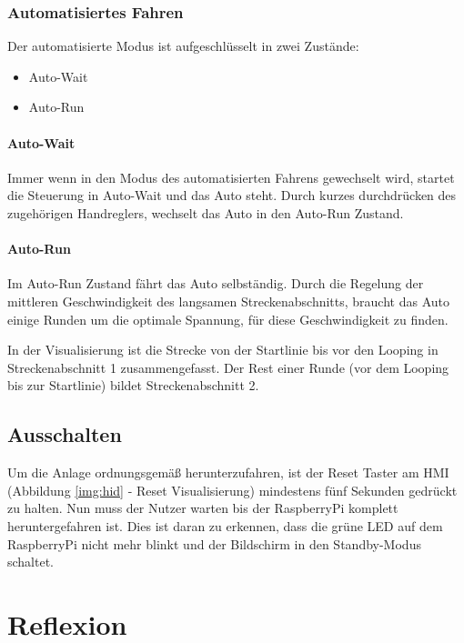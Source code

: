 \documentclass[a4paper, 11pt]{report}
\begin{document}
	\subsection{Automatisiertes Fahren}\label{subsec:bedAuto}
		Der automatisierte Modus ist aufgeschlüsselt in zwei Zustände:
		\begin{itemize}
			\item Auto-Wait
			\item Auto-Run
		\end{itemize}
		\subsubsection{Auto-Wait}
		Immer wenn in den Modus des automatisierten Fahrens gewechselt wird, startet die Steuerung in
		Auto-Wait und das Auto steht.
		Durch kurzes durchdrücken des zugehörigen Handreglers, wechselt das Auto in den Auto-Run Zustand.
		\subsubsection{Auto-Run}
			Im Auto-Run Zustand fährt das Auto selbständig. Durch die Regelung der mittleren Geschwindigkeit des langsamen Streckenabschnitts, braucht das Auto einige Runden um die optimale Spannung, für diese Geschwindigkeit zu finden.

			In der Visualisierung ist die Strecke von der Startlinie bis vor den Looping in Streckenabschnitt 1 zusammengefasst.
			Der Rest einer Runde (vor dem Looping bis zur Startlinie) bildet Streckenabschnitt 2.
\section{Ausschalten}
Um die Anlage ordnungsgemäß herunterzufahren, ist der Reset Taster am HMI (Abbildung \ref{img:hid} - Reset Visualisierung) mindestens fünf Sekunden gedrückt zu halten.
Nun muss der Nutzer warten bis der RaspberryPi komplett heruntergefahren ist. Dies ist daran zu erkennen, dass die grüne LED auf dem RaspberryPi nicht mehr blinkt und der Bildschirm in den Standby-Modus schaltet.
\chapter{Reflexion}
\end{document}
